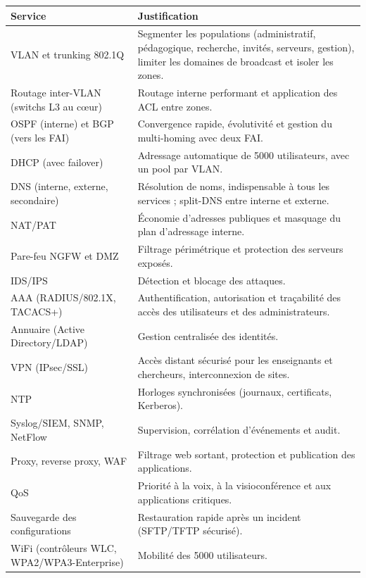 \documentclass[12pt,a4paper]{article}
\begin{document}
\begin{longtable}{|L{4.4cm}|L{10.2cm}|}
\hline
\textbf{Service} & \textbf{Justification} \\ \hline
\endhead
VLAN et trunking 802.1Q & Segmenter les populations (administratif,
pédagogique, recherche, invités, serveurs, gestion), limiter les
domaines de broadcast et isoler les zones. \\ \hline
Routage inter-VLAN (switchs L3 au cœur) & Routage interne performant et
application des ACL entre zones. \\ \hline
OSPF (interne) et BGP (vers les FAI) & Convergence rapide, évolutivité
et gestion du multi-homing avec deux FAI. \\ \hline
DHCP (avec failover) & Adressage automatique de 5000 utilisateurs, avec
un pool par VLAN. \\ \hline
DNS (interne, externe, secondaire) & Résolution de noms, indispensable à
tous les services ; split-DNS entre interne et externe. \\ \hline
NAT/PAT & Économie d'adresses publiques et masquage du plan d'adressage
interne. \\ \hline
Pare-feu NGFW et DMZ & Filtrage périmétrique et protection des serveurs
exposés. \\ \hline
IDS/IPS & Détection et blocage des attaques. \\ \hline
AAA (RADIUS/802.1X, TACACS+) & Authentification, autorisation et
traçabilité des accès des utilisateurs et des administrateurs. \\ \hline
Annuaire (Active Directory/LDAP) & Gestion centralisée des identités. \\
\hline
VPN (IPsec/SSL) & Accès distant sécurisé pour les enseignants et
chercheurs, interconnexion de sites. \\ \hline
NTP & Horloges synchronisées (journaux, certificats, Kerberos). \\ \hline
Syslog/SIEM, SNMP, NetFlow & Supervision, corrélation d'événements et
audit. \\ \hline
Proxy, reverse proxy, WAF & Filtrage web sortant, protection et
publication des applications. \\ \hline
QoS & Priorité à la voix, à la visioconférence et aux applications
critiques. \\ \hline
Sauvegarde des configurations & Restauration rapide après un incident
(SFTP/TFTP sécurisé). \\ \hline
WiFi (contrôleurs WLC, WPA2/WPA3-Enterprise) & Mobilité des 5000
utilisateurs. \\ \hline
\end{longtable}
\end{document}
